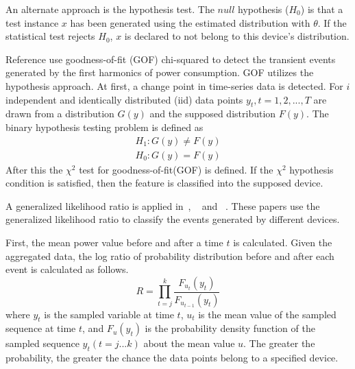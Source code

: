 An alternate approach is the hypothesis test.
The $null$ hypothesis ($H_0$) is that a test instance $x$ has been generated 
using the estimated distribution with $\theta$. 
If the statistical test rejects $H_0$, 
$x$ is declared to not belong to this device's distribution. 

Reference \cite{jin2011robust,jin2011time} use goodness-of-fit (GOF) chi-squared
to detect the transient events generated by
the first harmonics of power consumption.
GOF utilizes the hypothesis approach.
At first, a change point in time-series data is detected.
For $i$ independent and identically distributed (iid) data points $y_t,t=1,2,...,T$
are drawn from a distribution $G(y)$ and the supposed distribution $F(y)$.
The binary hypothesis testing problem is defined as
\begin{eqnarray}
H_1: G(y) \ne F(y) \\
H_0: G(y) = F(y)
\end{eqnarray}
After this the $\chi^2$ test for goodness-of-fit(GOF) is defined. 
If the $\chi^2$ hypothesis condition is satisfied, 
then the feature is classified into the supposed device. 


A generalized likelihood ratio is applied in~\cite{anderson2012event}, ~\cite{berges2011user} and ~\cite{luo2002monitoring}. 
These papers use the generalized likelihood ratio to classify
the events generated by different devices.

First, the mean power value before and after a time $t$ is calculated. 
Given the aggregated data,  
the log ratio of probability distribution before and after each event 
is calculated as follows. 
\begin{equation}
R= \prod_{t=j}^{k}\frac{F_{u_t}(y_t)}{F_{u_{t-1}}(y_t)}
\end{equation}
where $y_t$ is the sampled variable at time $t$, 
$u_t$ is the mean value of the sampled sequence at time $t$, 
and $F_{u}(y_t)$ is the probability density function of the sampled sequence 
$y_t(t=j...k)$ about the mean value $u$. 
The greater the probability, the greater the chance the data points belong 
to a specified device. 

